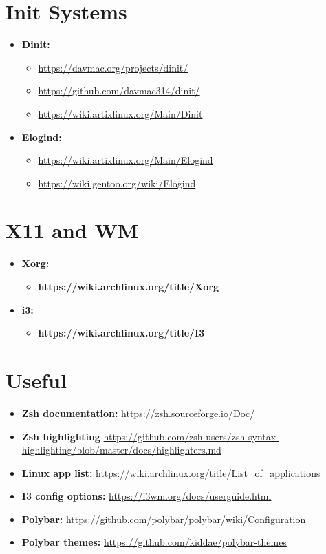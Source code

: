 \documentclass[10pt, a4paper, onecolumn, oneside, titlepage, openany]{book}
\begin{document}
\section{Init Systems}
\begin{itemize}
    \item \textbf{Dinit:}
    \begin{itemize}
        \item \url{https://davmac.org/projects/dinit/}
        \item \url{https://github.com/davmac314/dinit/}
        \item \url{https://wiki.artixlinux.org/Main/Dinit}
    \end{itemize}
    \item \textbf{Elogind:}
    \begin{itemize}
        \item \url{https://wiki.artixlinux.org/Main/Elogind}
        \item \url{https://wiki.gentoo.org/wiki/Elogind}
    \end{itemize}
\end{itemize}

\section{X11 and WM}
\begin{itemize}
    \item \textbf{Xorg:}
    \begin{itemize}
        \item \textbf{https://wiki.archlinux.org/title/Xorg}
    \end{itemize}
    \item \textbf{i3:}
        \begin{itemize}
            \item \textbf{https://wiki.archlinux.org/title/I3}
        \end{itemize}
\end{itemize}

\section{Useful}
\begin{itemize}
    \item \textbf{Zsh documentation:} \url{https://zsh.sourceforge.io/Doc/}
    \item \textbf{Zsh highlighting} \url{https://github.com/zsh-users/zsh-syntax-highlighting/blob/master/docs/highlighters.md}
    \item \textbf{Linux app list:} \url{https://wiki.archlinux.org/title/List_of_applications}
    \item \textbf{I3 config options:} \url{https://i3wm.org/docs/userguide.html}
    \item \textbf{Polybar:} \url{https://github.com/polybar/polybar/wiki/Configuration}
    \item \textbf{Polybar themes:} \url{https://github.com/kiddae/polybar-themes}    
\end{itemize}
\end{document}
